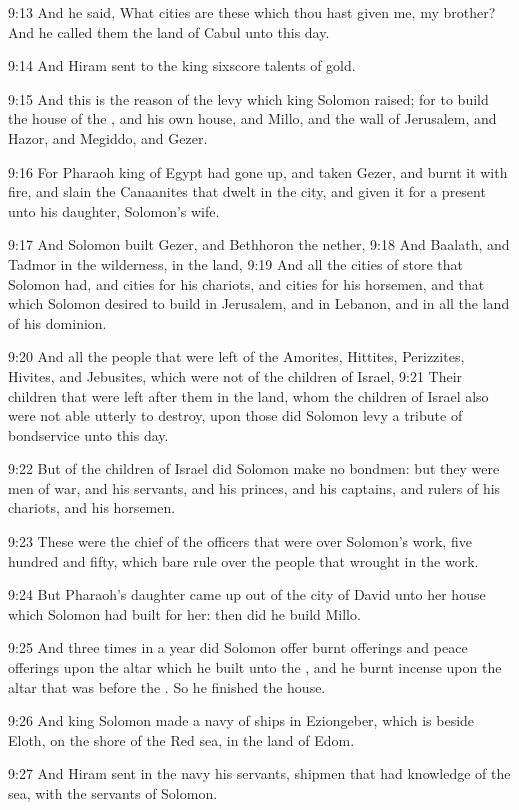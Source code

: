 9:13 And he said, What cities are these which thou hast given me, my
brother? And he called them the land of Cabul unto this day.

9:14 And Hiram sent to the king sixscore talents of gold.

9:15 And this is the reason of the levy which king Solomon raised; for
to build the house of the \LORD, and his own house, and Millo, and the
wall of Jerusalem, and Hazor, and Megiddo, and Gezer.

9:16 For Pharaoh king of Egypt had gone up, and taken Gezer, and burnt
it with fire, and slain the Canaanites that dwelt in the city, and
given it for a present unto his daughter, Solomon's wife.

9:17 And Solomon built Gezer, and Bethhoron the nether, 9:18 And
Baalath, and Tadmor in the wilderness, in the land, 9:19 And all the
cities of store that Solomon had, and cities for his chariots, and
cities for his horsemen, and that which Solomon desired to build in
Jerusalem, and in Lebanon, and in all the land of his dominion.

9:20 And all the people that were left of the Amorites, Hittites,
Perizzites, Hivites, and Jebusites, which were not of the children of
Israel, 9:21 Their children that were left after them in the land,
whom the children of Israel also were not able utterly to destroy,
upon those did Solomon levy a tribute of bondservice unto this day.

9:22 But of the children of Israel did Solomon make no bondmen: but
they were men of war, and his servants, and his princes, and his
captains, and rulers of his chariots, and his horsemen.

9:23 These were the chief of the officers that were over Solomon's
work, five hundred and fifty, which bare rule over the people that
wrought in the work.

9:24 But Pharaoh's daughter came up out of the city of David unto her
house which Solomon had built for her: then did he build Millo.

9:25 And three times in a year did Solomon offer burnt offerings and
peace offerings upon the altar which he built unto the \LORD, and he
burnt incense upon the altar that was before the \LORD. So he finished
the house.

9:26 And king Solomon made a navy of ships in Eziongeber, which is
beside Eloth, on the shore of the Red sea, in the land of Edom.

9:27 And Hiram sent in the navy his servants, shipmen that had
knowledge of the sea, with the servants of Solomon.

